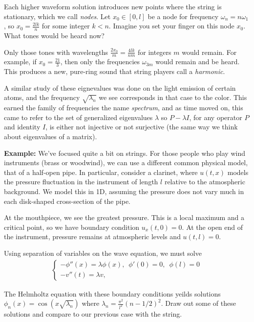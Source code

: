 \documentclass{article}
\begin{document}
	Each higher waveform solution introduces new points where the string is stationary, which we call \textit{nodes}. Let $x_0 \in [0,l]$ be a node for frequency $\omega_{n} = n \omega_{1}$, so $x_0 = \frac{2l k}{n}$ for some integer $k < n$. Imagine you set your finger on this node $x_0$. What tones would be heard now? 
	
	Only those tones with wavelengths $\frac{2x_0}{m} = \frac{4lk}{nm}$ for integers $m$ would remain. For example, if $x_0 = \frac{21}{3}$, then only the frequencies $\omega_{3 m }$ would remain and be heard. This produces a new, pure-ring sound that string players call a \textit{harmonic}. 
	
	A similar study of these eignevalues was done on the light emission of certain atoms, and the frequency $\sqrt{\lambda_{n}}$ we see corresponds in that case to the color. This earned the family of frequencies the name \textit{spectrum}, and as time moved on, this came to refer to the set of generalized eigenvalues $\lambda$ so  $P - \lambda I$, for any operator $P$ and identity $I$, is either not injective or not surjective (the same way we think about eigenvalues of a matrix). 
	
	\vspace{0.25 cm}
	
	\textbf{Example:} We've focused quite a bit on strings. For those people who play wind instruments (brass or woodwind), we can use a different common physical model, that of a half-open pipe. In particular, consider a clarinet, where $u(t,x)$ models the pressure fluctuation in the instrument of length $l$ relative to the atmospheric background. We model this in 1D, assuming the pressure does not vary much in each disk-shaped cross-section of the pipe. 
	
	At the mouthpiece, we see the greatest pressure. This is a local maximum and a critical point, so we have boundary condition $u_{x}(t,0) = 0$. At the open end of the instrument, pressure remains at atmospheric levels and $u(t,l) = 0$. 
	
	Using separation of variables on the wave equation, we must solve 
	\begin{align*}
		\begin{cases}
			-\phi '' (x) = \lambda \phi(x), \,\,\,\phi'(0) = 0, \,\,\, \phi(l)=0 \\
			-v''(t) = \lambda v, 
		\end{cases}
	\end{align*}
	
	The Helmholtz equation with these boundary conditions yeilds solutions $\phi_{n}(x) = \cos(x\sqrt{\lambda_{n}})$ where $\lambda_{n} = \frac{\pi^{2}}{l^{2}}(n - 1/2)^{2}$. Draw out some of these solutions and compare to our previous case with the string. 
	
\end{document}
